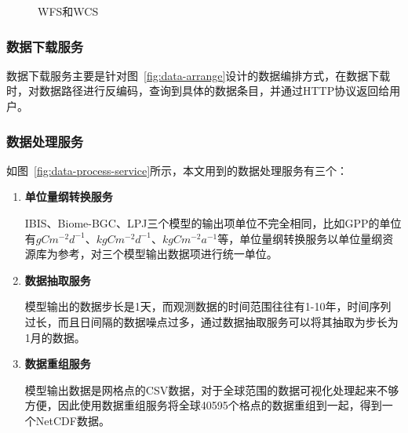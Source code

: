 \begin{figure}[!htbp]
    \centering

    \hfill

    \caption{WFS和WCS}
    \label{fig:wfs-wcs}
\end{figure}

\subsubsection{数据下载服务}
数据下载服务主要是针对图~\ref{fig:data-arrange}设计的数据编排方式，在数据下载时，对数据路径进行反编码，查询到具体的数据条目，并通过HTTP协议返回给用户。




\subsubsection{数据处理服务}
如图~\ref{fig:data-process-service}所示，本文用到的数据处理服务有三个：
\begin{enumerate}[(1)]
    \item \textbf{单位量纲转换服务}
    
    IBIS、Biome-BGC、LPJ三个模型的输出项单位不完全相同，比如GPP的单位有$gC m^{-2} d^{-1}$、$kgC m^{-2} d^{-1}$、$kgC m^{-2} a^{-1}$等，单位量纲转换服务以单位量纲资源库为参考，对三个模型输出数据项进行统一单位。

    \item \textbf{数据抽取服务}
    
    模型输出的数据步长是1天，而观测数据的时间范围往往有1-10年，时间序列过长，而且日间隔的数据噪点过多，通过数据抽取服务可以将其抽取为步长为1月的数据。
    
    \item \textbf{数据重组服务}
    
    模型输出数据是网格点的CSV数据，对于全球范围的数据可视化处理起来不够方便，因此使用数据重组服务将全球40595个格点的数据重组到一起，得到一个NetCDF数据。

\end{enumerate}

